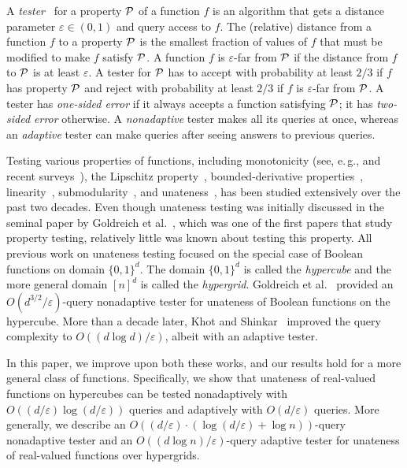 \documentclass[11pt]{article}
\numberwithin{equation}{section}
\theoremstyle{definition}
\theoremstyle{plain}
\newcommand{\eg}{e.\,g.}
\newcommand{\eps}{\varepsilon}
\begin{document}
A \emph{tester}~\cite{RS96,GGR98} for a property $\cal P$ of a function $f$ is an algorithm that gets a distance parameter $\eps\in(0,1)$ and query access to $f$. The (relative) distance from a function $f$ to a property $\cal P$ is the smallest fraction of values of $f$ that must be modified to make $f$ satisfy $\cal P$. A function $f$ is $\eps$-far from $\cal P$ if the distance from $f$ to $\cal P$ is at least $\eps$. A tester for $\cal P$ has to accept with probability at least $2/3$ if $f$ has property $\cal P$ and reject with probability at least $2/3$ if $f$ is $\eps$-far from $\cal P$. A tester has \emph{one-sided error} if it always accepts a function satisfying $\cal P$; it has \emph{ two-sided
error} otherwise.
A \emph{nonadaptive} tester makes all its queries at once, whereas an \emph{adaptive} tester can make queries after seeing answers to previous queries.

Testing various properties of functions, including
monotonicity
(see, \eg, \cite{GGLRS00, Ras99, DGLRRS99, EKKRV00, LR01, FLNRRS02, Ras03, Fis04, HK07, AC06, HK08, BRW05, BBM12, BGJRW12, BCGM12, CS13, BlaRY14, BerRY14, CS14, CS16, CDJS17, CST14, CDST15, KMS18, BB15, BB16, DRTV16, PRV17, CWX17, B18, BCS18, CS19, BCS20, PRW20} and recent surveys~\cite{Ras10, Ras16, C16a}),
the Lipschitz property~\cite{JR13, CS13, DJRT13, BlaRY14, AJMR16}, bounded-derivative properties~\cite{CDJS17}, linearity~\cite{BLR93, BCHKS96, BCLR08, KLX10, RR16}, submodularity~\cite{PRR03, RY13, SV14, BB17}, and unateness~\cite{GGLRS00,KS16}, has been studied extensively over the past two decades. Even though unateness testing was initially discussed in the seminal paper
by Goldreich et al.~\cite{GGLRS00},
which was one of the first papers that study property testing, 
%
relatively little was known about testing this property. All previous work on unateness testing focused on the special case of Boolean functions on domain $\{0,1\}^d$. The domain $\{0,1\}^d$ is called the \emph{hypercube} and the more general domain $[n]^d$ is called the \emph{hypergrid}.
Goldreich et al.~\cite{GGLRS00}
provided 
%
%
%
an
%
$O({d^{3/2}}/{\eps})$-query nonadaptive tester for unateness of Boolean functions on the hypercube.
More than a decade later, Khot and Shinkar~\cite{KS16} improved the query complexity
to $O((d\log d)/\eps)$, albeit with an adaptive tester.

In this paper, we improve upon both these works, and our results hold for a more general class of functions.
Specifically, we show that unateness of real-valued functions on hypercubes can be tested nonadaptively with $O(( d /\eps) \log (d/ \eps))$ queries and adaptively with $O(d/\eps)$ queries. More generally, we describe 
%
%
an
%
$O((d/\eps) \cdot(\log (d/\eps) + \log n))$-query nonadaptive tester and 
%
%
an
%
$O(({d\log n})/\eps)$-query adaptive tester for unateness of real-valued functions over hypergrids.
\end{document}
